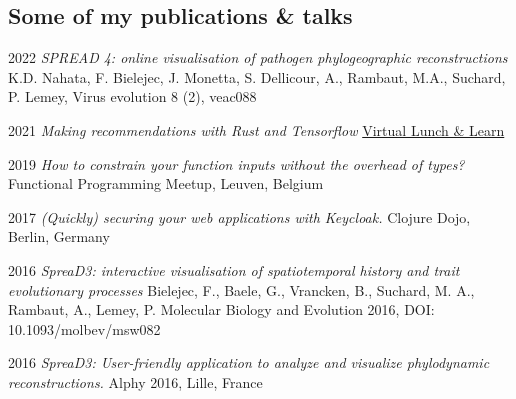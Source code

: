 \documentclass[a4paper, oneside, final]{scrartcl}
\newenvironment{lyxlist}[1]
{\begin{list}{}
{\settowidth{\labelwidth}{#1}
 \setlength{\leftmargin}{\labelwidth}
 \addtolength{\leftmargin}{\labelsep}
 \renewcommand{\makelabel}[1]{##1\hfil}}}
{\end{list}}
\newcommand{\noun}[1]{\textsc{#1}}
\begin{document}
\begin{center}
\section{Some of my publications \& talks}

\begin{lyxlist}{00.00.0000}

\item [{\noun{\scriptsize 2022}}] \emph{SPREAD 4: online visualisation of pathogen phylogeographic reconstructions}
K.D. Nahata, F. Bielejec, J. Monetta, S. Dellicour, A., Rambaut, M.A., Suchard, P. Lemey,
Virus evolution 8 (2), veac088
  
\item [{\noun{\scriptsize 2021}}] \emph{Making recommendations with Rust and Tensorflow }
\href{https://www.youtube.com/watch?v=RG4g0Wd_elo&t=1s}{Virtual Lunch \& Learn}

\item [{\noun{\scriptsize 2019}}] \emph{How to constrain your function inputs without the overhead of types? }
Functional Programming Meetup, Leuven, Belgium

\item [{\noun{\scriptsize 2017}}] \emph{(Quickly) securing your web applications with Keycloak. }
Clojure Dojo, Berlin, Germany


\item [{\noun{\scriptsize 2016}}] \emph{SpreaD3: interactive visualisation of spatiotemporal history and trait evolutionary processes}
Bielejec, F., Baele, G., Vrancken, B.,  Suchard, M. A., Rambaut, A., Lemey, P.
Molecular Biology and Evolution  2016, DOI: 10.1093/molbev/msw082


\item [{\noun{\scriptsize 2016}}] \emph{SpreaD3: User-friendly application to analyze and visualize phylodynamic reconstructions. }
Alphy 2016, Lille, France


\end{lyxlist}
\end{center}
\end{document}
